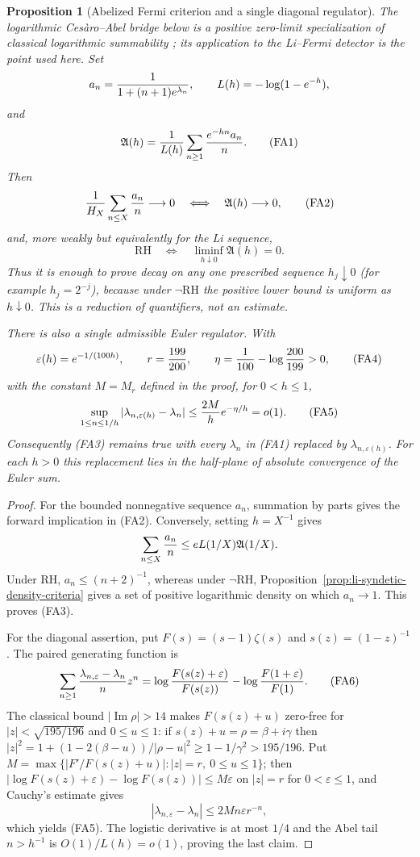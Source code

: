 \documentclass[11pt]{amsart}
\newtheorem{proposition}[theorem]{Proposition}
\theoremstyle{definition}
\theoremstyle{remark}
\theoremstyle{definition}
\newcommand{\RH}{\mathrm{RH}}
\renewcommand{\Im}{\operatorname{Im}}
\begin{document}
\begin{proposition}[Abelized Fermi criterion and a single diagonal regulator]
\label{prop:fermi-abel-diagonal}
The logarithmic Ces\`aro--Abel bridge below is a positive zero-limit
specialization of classical logarithmic summability
\cite{BinghamGashi}; its application to the Li--Fermi detector is the point
used here.
Set
\[
 a_n={1\over1+(n+1)e^{\lambda_n}},\qquad
 L(h)=-\log(1-e^{-h}),
\]
and
\[
 \mathfrak A(h)={1\over L(h)}
       \sum_{n\ge1}{e^{-hn}a_n\over n}.                    \tag{FA1}
\]
Then
\[
 {1\over H_X}\sum_{n\le X}{a_n\over n}\longrightarrow0
 \quad\Longleftrightarrow\quad
 \mathfrak A(h)\longrightarrow0,                           \tag{FA2}
\]
and, more weakly but equivalently for the Li sequence,
\[
 \boxed{\quad\RH\quad\Longleftrightarrow\quad
        \liminf_{h\downarrow0}\mathfrak A(h)=0.\quad}      \tag{FA3}
\]
Thus it is enough to prove decay on any one prescribed sequence
$h_j\downarrow0$ (for example $h_j=2^{-j}$), because under $\neg\RH$ the
positive lower bound is uniform as $h\downarrow0$.  This is a reduction of
quantifiers, not an estimate.

There is also a single admissible Euler regulator.  With
\[
 \varepsilon(h)=e^{-1/(100h)},\qquad
 r={199\over200},\qquad
 \eta={1\over100}-\log{200\over199}>0,                     \tag{FA4}
\]
with the constant $M=M_r$ defined in the proof, for $0<h\le1$,
\[
 \sup_{1\le n\le1/h}|\lambda_{n,\varepsilon(h)}-\lambda_n|
 \le {2M\over h}e^{-\eta/h}=o(1).                          \tag{FA5}
\]
Consequently (FA3) remains true with every $\lambda_n$ in (FA1) replaced
by $\lambda_{n,\varepsilon(h)}$.  For each $h>0$ this replacement lies in
the half-plane of absolute convergence of the Euler sum.
\end{proposition}

\begin{proof}
For the bounded nonnegative sequence $a_n$, summation by parts gives the
forward implication in (FA2).  Conversely, setting $h=X^{-1}$ gives
\[
 \sum_{n\le X}{a_n\over n}\le eL(1/X)\mathfrak A(1/X).
\]
Under RH, $a_n\le(n+2)^{-1}$, whereas under $\neg\RH$,
Proposition~\ref{prop:li-syndetic-density-criteria} gives a set of positive
logarithmic density on which $a_n\to1$.  This proves (FA3).

For the diagonal assertion, put $F(s)=(s-1)\zeta(s)$ and $s(z)=(1-z)^{-1}$.
The paired generating function is
\[
 \sum_{n\ge1}{\lambda_{n,\varepsilon}-\lambda_n\over n}z^n
 =\log{F(s(z)+\varepsilon)\over F(s(z))}
  -\log{F(1+\varepsilon)\over F(1)}.                        \tag{FA6}
\]
The classical bound $|\Im\rho|>14$ makes
$F(s(z)+u)$ zero-free for $|z|<\sqrt{195/196}$ and
$0\le u\le1$: if $s(z)+u=\rho=\beta+i\gamma$ then
$|z|^2=1+(1-2(\beta-u))/|\rho-u|^2\ge1-1/\gamma^2>195/196$.
Put $M=\max\{|F'/F(s(z)+u)|:|z|=r,\ 0\le u\le1\}$; then
$|\log F(s(z)+\varepsilon)-\log F(s(z))|\le M\varepsilon$ on $|z|=r$ for
$0<\varepsilon\le1$, and Cauchy's estimate gives
\[
 |\lambda_{n,\varepsilon}-\lambda_n|
 \le2Mn\varepsilon r^{-n},
\]
which yields (FA5).  The logistic derivative is at most $1/4$ and the
Abel tail $n>h^{-1}$ is $O(1)/L(h)=o(1)$, proving the last claim.
\end{proof}
\end{document}
